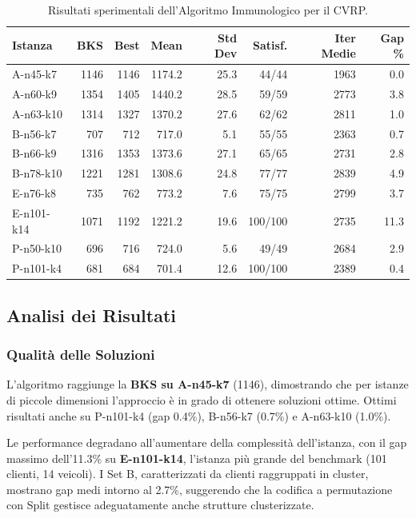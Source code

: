 \documentclass[a4paper,12pt]{article}
\begin{document}
\begin{table}[H]
\centering
\caption{Risultati sperimentali dell'Algoritmo Immunologico per il CVRP.}
\label{tab:results}
\begin{tabular}{lrrrrrrr}
\toprule
Istanza & BKS & Best & Mean & Std Dev & Satisf. & Iter Medie & Gap \% \\
\midrule
A-n45-k7 & 1146 & 1146 & 1174.2 & 25.3 & 44/44 & 1963 & 0.0 \\
A-n60-k9 & 1354 & 1405 & 1440.2 & 28.5 & 59/59 & 2773 & 3.8 \\
A-n63-k10 & 1314 & 1327 & 1370.2 & 27.6 & 62/62 & 2811 & 1.0 \\
B-n56-k7 & 707 & 712 & 717.0 & 5.1 & 55/55 & 2363 & 0.7 \\
B-n66-k9 & 1316 & 1353 & 1373.6 & 27.1 & 65/65 & 2731 & 2.8 \\
B-n78-k10 & 1221 & 1281 & 1308.6 & 24.8 & 77/77 & 2839 & 4.9 \\
E-n76-k8 & 735 & 762 & 773.2 & 7.6 & 75/75 & 2799 & 3.7 \\
E-n101-k14 & 1071 & 1192 & 1221.2 & 19.6 & 100/100 & 2735 & 11.3 \\
P-n50-k10 & 696 & 716 & 724.0 & 5.6 & 49/49 & 2684 & 2.9 \\
P-n101-k4 & 681 & 684 & 701.4 & 12.6 & 100/100 & 2389 & 0.4 \\
\bottomrule
\end{tabular}
\end{table}

\subsection{Analisi dei Risultati}

\subsubsection{Qualità delle Soluzioni}

L'algoritmo raggiunge la \textbf{BKS su A-n45-k7} (1146), dimostrando che per istanze di piccole dimensioni l'approccio è in grado di ottenere soluzioni ottime. Ottimi risultati anche su P-n101-k4 (gap 0.4\%), B-n56-k7 (0.7\%) e A-n63-k10 (1.0\%).

Le performance degradano all'aumentare della complessità dell'istanza, con il gap massimo dell'11.3\% su \textbf{E-n101-k14}, l'istanza più grande del benchmark (101 clienti, 14 veicoli). I Set B, caratterizzati da clienti raggruppati in cluster, mostrano gap medi intorno al 2.7\%, suggerendo che la codifica a permutazione con Split gestisce adeguatamente anche strutture clusterizzate.
\end{document}
